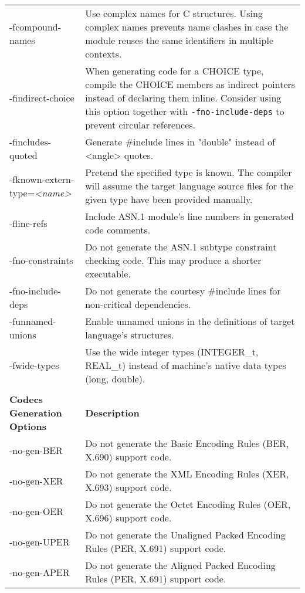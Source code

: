 \documentclass[english,oneside,12pt]{book}
\begin{document}
\begin{longtable}{lp{4in}}
{\ttfamily -fcompound-names} & {\small Use complex names for C structures. Using complex names prevents
name clashes in case the module reuses the same identifiers in multiple
contexts.}\\
{\ttfamily -findirect-choice} & {\small When generating code for a CHOICE type, compile the CHOICE
members as indirect pointers instead of declaring them inline. Consider
using this option together with \texttt{-fno-include-deps}
to prevent circular references.}\\
{\ttfamily -fincludes-quoted} & {\small Generate \#include lines in "double" instead of <angle> quotes.}\\
{\ttfamily -fknown-extern-type=\emph{<name>}} & {\small Pretend the specified type is known. The compiler will assume
the target language source files for the given type have been provided
manually. }\\
{\ttfamily -fline-refs} & {\small Include ASN.1 module's line numbers in generated code comments.}\\
{\ttfamily -fno-constraints} & {\small Do not generate the ASN.1 subtype constraint checking code. This
may produce a shorter executable.}\\
{\ttfamily -fno-include-deps} & {\small Do not generate the courtesy \#include lines for non-critical dependencies.}\\
{\ttfamily -funnamed-unions} & {\small Enable  unnamed  unions in the definitions of target language's structures.}\\
{\ttfamily -fwide-types} & {\small Use the wide integer types (INTEGER\_t, REAL\_t) instead of machine's native data types (long, double). }\\\\
\textbf{Codecs Generation Options} & \textbf{Description}\\
\midrule
{\ttfamily -no-gen-BER} & {\small Do not generate the Basic Encoding Rules (BER, X.690) support code.}\\
{\ttfamily -no-gen-XER} & {\small Do not generate the XML Encoding Rules (XER, X.693) support code.}\\
{\ttfamily -no-gen-OER} & {\small Do not generate the Octet Encoding Rules (OER, X.696) support code.}\\
{\ttfamily -no-gen-UPER} & {\small Do not generate the Unaligned Packed Encoding Rules (PER, X.691) support code.}\\
{\ttfamily -no-gen-APER} & {\small Do not generate the Aligned Packed Encoding Rules (PER, X.691) support code.}\\

\end{longtable}
\end{document}
